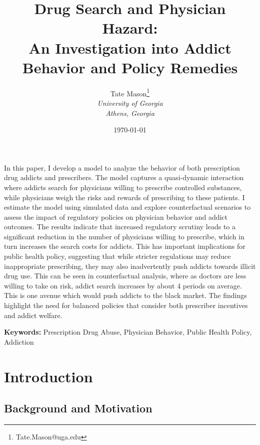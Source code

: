 \documentclass[11pt,a4paper]{article}
\title{Drug Search and Physician Hazard: \\
An Investigation into Addict Behavior and Policy Remedies}
\author{
    Tate Mason\thanks{Tate.Mason@uga.edu} \\
    \textit{University of Georgia} \\
    \textit{Athens, Georgia} \\
}
\date{\today}
\newenvironment{abstract}%
{\cleardoublepage\null \vfill\begin{center}%
\bfseries \abstractname \end{center}}%
{\vfill\null}
\begin{document}
\maketitle
\thispagestyle{empty}

\begin{abstract}
\noindent %

In this paper, I develop a model to analyze the behavior of both prescription drug addicts and prescribers. The model captures a quasi-dynamic interaction where addicts search for physicians willing to prescribe controlled substances, while physicians weigh the risks and rewards of prescribing to these patients. I estimate the model using simulated data and explore counterfactual scenarios to assess the impact of regulatory policies on physician behavior and addict outcomes. The results indicate that increased regulatory scrutiny leads to a significant reduction in the number of physicians willing to prescribe, which in turn increases the search costs for addicts. This has important implications for public health policy, suggesting that while stricter regulations may reduce inappropriate prescribing, they may also inadvertently push addicts towards illicit drug use. This can be seen in counterfactual analysis, where as doctors are less willing to take on risk, addict search increases by about 4 periods on average. This is one avenue which would push addicts to the black market. The findings highlight the need for balanced policies that consider both prescriber incentives and addict welfare.

\vspace{0.3cm}
\noindent \textbf{Keywords:} Prescription Drug Abuse, Physician Behavior, Public Health Policy, Addiction
\end{abstract}

\newpage
\setcounter{page}{1}

\section{Introduction}
\label{sec:introduction}


\subsection{Background and Motivation}
\label{subsec:background}
\end{document}
